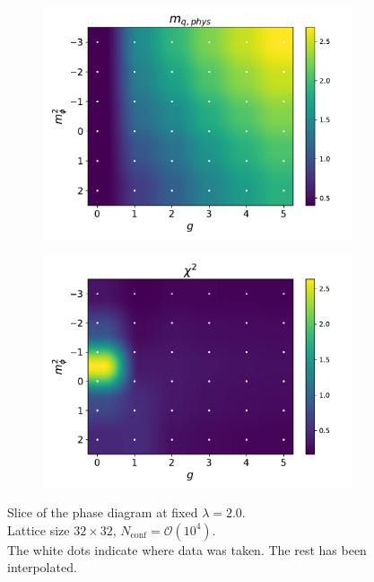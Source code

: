 \begin{figure}[htp]
\begin{subfigure}[b]{0.47\textwidth}
        \includegraphics[width=\textwidth]{figures/phase_diagram/g-m/phase_diagram_mqphys.pdf}
    \end{subfigure}
    \begin{subfigure}[b]{0.47\textwidth}
        \includegraphics[width=\textwidth]{figures/phase_diagram/g-m/phase_diagram_chi2.pdf}
    \end{subfigure}
    \caption{Slice of the phase diagram at fixed $\lambda = 2.0$. \\ Lattice size $32 \times 32$, $N_\text{conf} = \mathcal{O}(10^4)$.\\ The white dots indicate where data was taken. The rest has been interpolated.}
    \label{fig:phase_diagram_g_m}
\end{figure}\\
